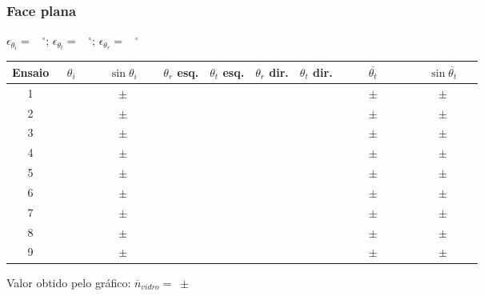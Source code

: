 \documentclass[a4paper,12pt]{article}  %
\begin{document}
\newpage
\subsubsection{\sf Face plana}

$\epsilon_{\theta_i}=$~\underline{\makebox[1cm][r]{~}} $^\circ$; 
$\epsilon_{\theta_t}=$~\underline{\makebox[1cm][r]{~}} $^\circ$;
$\epsilon_{\theta_r}=$~\underline{\makebox[1cm][r]{~}} $^\circ$

\begin{center}
	\begin{tabular}{|c|c|c|c|c|c|c|c|c|}
	\hline
	 Ensaio   &  $\theta_i $  & $\sin\theta_i$  &  $\theta_r $ esq.  & $\theta_t $ esq.  & $\theta_r $ dir.  & $\theta_t $ dir. & $\overline{\theta_t }$  & $\sin\overline{\theta_t}$ \\
	\hline \hline
	 1 & $\qquad$ & $\qquad\pm\qquad$ & & & & & $\qquad\pm\qquad$ & $\qquad\pm\qquad$   \\\cline{1-9}
	 2 & & $\quad\pm\quad$ & & & & & $\quad\pm\quad$ & $\quad\pm\quad$   \\\cline{1-9}
	 3 & & $\quad\pm\quad$ & & & & & $\quad\pm\quad$ & $\quad\pm\quad$   \\\cline{1-9}
	 4 & & $\quad\pm\quad$ & & & & & $\quad\pm\quad$ & $\quad\pm\quad$   \\\cline{1-9}
	 5 & & $\quad\pm\quad$ & & & & & $\quad\pm\quad$ & $\quad\pm\quad$   \\\cline{1-9}
	 6 & & $\quad\pm\quad$ & & & & & $\quad\pm\quad$ & $\quad\pm\quad$   \\\cline{1-9}
	 7 & & $\quad\pm\quad$ & & & & & $\quad\pm\quad$ & $\quad\pm\quad$   \\\cline{1-9}
	 8 & & $\quad\pm\quad$ & & & & & $\quad\pm\quad$ & $\quad\pm\quad$   \\\cline{1-9}
	 9 & & $\quad\pm\quad$ & & & & & $\quad\pm\quad$ & $\quad\pm\quad$   \\
	  \hline
	\end{tabular}
\end{center}




Valor obtido pelo gráfico: $\overline{n}_{vidro} =$~\underline{\makebox[2cm][r]{~}}$\pm$~\underline{\makebox[2cm][r]{~}}


\end{document}

